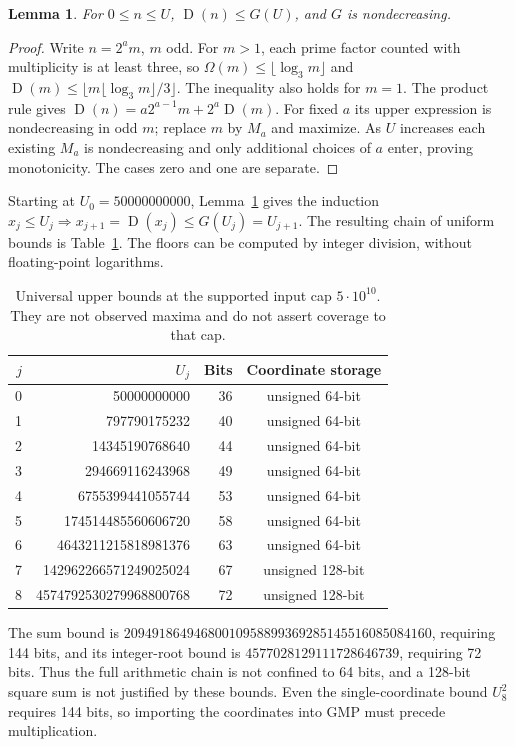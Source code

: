 \documentclass[11pt]{article}
\newcommand{\D}{\operatorname{D}}
\newtheorem{lemma}[theorem]{Lemma}
\theoremstyle{definition}
\theoremstyle{remark}
\begin{document}
\begin{lemma}\label{lem:bound}
For $0\le n\le U$, $\D(n)\le G(U)$, and $G$ is nondecreasing.
\end{lemma}
\begin{proof}
Write $n=2^a m$, $m$ odd. For $m>1$, each prime factor counted
with multiplicity is at least three, so
$\Omega(m)\le\lfloor\log_3m\rfloor$ and
$\D(m)\le\lfloor m\lfloor\log_3m\rfloor/3\rfloor$.
The inequality also holds for $m=1$.
The product rule gives
$\D(n)=a2^{a-1}m+2^a\D(m)$.
For fixed $a$ its upper expression is nondecreasing in odd $m$;
replace $m$ by $M_a$ and maximize. As $U$ increases each existing
$M_a$ is nondecreasing and only additional choices of $a$ enter,
proving monotonicity. The cases zero and one are separate.
\end{proof}

Starting at $U_0=50000000000$, Lemma~\ref{lem:bound} gives the
induction $x_j\le U_j\Rightarrow x_{j+1}=\D(x_j)\le G(U_j)=U_{j+1}$.
The resulting chain of uniform bounds is Table~\ref{tab:bounds}. The floors can be computed by integer
division, without floating-point logarithms.

\begin{table}[htbp]
\centering\small
\begin{tabular}{rrrc}
\toprule
$j$ & $U_j$ & Bits & Coordinate storage\\
\midrule
0&50000000000&36&unsigned 64-bit\\
1&797790175232&40&unsigned 64-bit\\
2&14345190768640&44&unsigned 64-bit\\
3&294669116243968&49&unsigned 64-bit\\
4&6755399441055744&53&unsigned 64-bit\\
5&174514485560606720&58&unsigned 64-bit\\
6&4643211215818981376&63&unsigned 64-bit\\
7&142962266571249025024&67&unsigned 128-bit\\
8&4574792530279968800768&72&unsigned 128-bit\\
\bottomrule
\end{tabular}
\caption{Universal upper bounds at the supported input cap $5\cdot10^{10}$.
They are not observed maxima and do not assert coverage to that cap.}
\label{tab:bounds}
\end{table}

The sum bound is
$20949186494680010958899369285145516085084160$, requiring 144 bits,
and its integer-root bound is $4577028129111728646739$, requiring
72 bits. Thus the full arithmetic chain is not confined to 64 bits,
and a 128-bit square sum is not justified by these bounds.
Even the single-coordinate bound $U_8^2$ requires 144 bits, so
importing the coordinates into GMP must precede multiplication.
\end{document}
